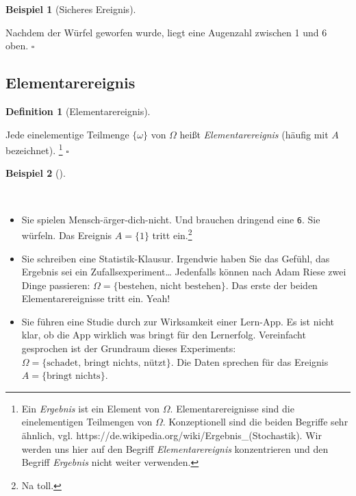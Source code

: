 \documentclass[
  ngerman,
  letterpaper,
  twoside,
  open=any]{scrbook}
\providecommand{\tightlist}{%
  \setlength{\itemsep}{0pt}\setlength{\parskip}{0pt}}\usepackage{longtable,booktabs,array}
\theoremstyle{definition}
\newtheorem{example}{Beispiel}[chapter]
\theoremstyle{plain}
\theoremstyle{definition}
\theoremstyle{definition}
\newtheorem{definition}{Definition}[chapter]
\theoremstyle{definition}
\newtheorem{example}{Beispiel}[chapter]
\theoremstyle{definition}
\theoremstyle{remark}
\begin{document}
\begin{example}[Sicheres
Ereignis]\protect\hypertarget{exm-sicher}{}\label{exm-sicher}

Nachdem der Würfel geworfen wurde, liegt eine Augenzahl zwischen 1 und 6
oben. \(\square\)

\end{example}

\subsection{Elementarereignis}\label{elementarereignis}

\begin{definition}[Elementarereignis]\protect\hypertarget{def-defelementarereignis}{}\label{def-defelementarereignis}

Jede einelementige Teilmenge \(\{\omega\}\) von \(\Omega\) heißt
\emph{Elementarereignis} (häufig mit \(A\) bezeichnet). \footnote{Ein
  \emph{Ergebnis} ist ein Element von \(\Omega\). Elementarereignisse
  sind die einelementigen Teilmengen von \(\Omega\). Konzeptionell sind
  die beiden Begriffe sehr ähnlich, vgl.
  https://de.wikipedia.org/wiki/Ergebnis\_(Stochastik). Wir werden uns
  hier auf den Begriff \emph{Elementarereignis} konzentrieren und den
  Begriff \emph{Ergebnis} nicht weiter verwenden.} \(\square\)

\end{definition}

\begin{example}[]\protect\hypertarget{exm-exmelementarereignis}{}\label{exm-exmelementarereignis}

~

\begin{itemize}
\tightlist
\item
  Sie spielen Mensch-ärger-dich-nicht. Und brauchen dringend eine
  \texttt{6}. Sie würfeln. Das Ereignis \(A = \{1\}\) tritt
  ein.\footnote{Na toll.}
\item
  Sie schreiben eine Statistik-Klausur. Irgendwie haben Sie das Gefühl,
  das Ergebnis sei ein Zufallsexperiment\ldots{} Jedenfalls können nach
  Adam Riese zwei Dinge passieren:
  \(\Omega= \{\text{bestehen, nicht bestehen}\}\). Das erste der beiden
  Elementarereignisse tritt ein. Yeah!
\item
  Sie führen eine Studie durch zur Wirksamkeit einer Lern-App. Es ist
  nicht klar, ob die App wirklich was bringt für den Lernerfolg.
  Vereinfacht gesprochen ist der Grundraum dieses Experiments:
  \(\Omega = \{\text{schadet, bringt nichts, nützt}\}\). Die Daten
  sprechen für das Ereignis \(A = \{\text{bringt nichts}\}\).
\end{itemize}

\end{example}
\end{document}
